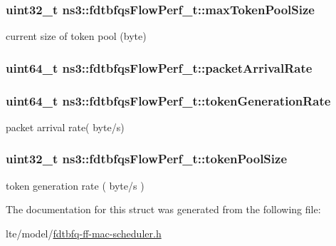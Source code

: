 \subsubsection[{\texorpdfstring{max\+Token\+Pool\+Size}{maxTokenPoolSize}}]{\setlength{\rightskip}{0pt plus 5cm}uint32\+\_\+t ns3\+::fdtbfqs\+Flow\+Perf\+\_\+t\+::max\+Token\+Pool\+Size}\hypertarget{structns3_1_1fdtbfqsFlowPerf__t_acf8230e7891aff039887ee3b4b31cc5a}{}\label{structns3_1_1fdtbfqsFlowPerf__t_acf8230e7891aff039887ee3b4b31cc5a}


current size of token pool (byte) 

\subsubsection[{\texorpdfstring{packet\+Arrival\+Rate}{packetArrivalRate}}]{\setlength{\rightskip}{0pt plus 5cm}uint64\+\_\+t ns3\+::fdtbfqs\+Flow\+Perf\+\_\+t\+::packet\+Arrival\+Rate}\hypertarget{structns3_1_1fdtbfqsFlowPerf__t_aa6fd077fde3105081d62e6c46741a1c5}{}\label{structns3_1_1fdtbfqsFlowPerf__t_aa6fd077fde3105081d62e6c46741a1c5}
\subsubsection[{\texorpdfstring{token\+Generation\+Rate}{tokenGenerationRate}}]{\setlength{\rightskip}{0pt plus 5cm}uint64\+\_\+t ns3\+::fdtbfqs\+Flow\+Perf\+\_\+t\+::token\+Generation\+Rate}\hypertarget{structns3_1_1fdtbfqsFlowPerf__t_ada77287bdf68b8d1919a896cd4892822}{}\label{structns3_1_1fdtbfqsFlowPerf__t_ada77287bdf68b8d1919a896cd4892822}


packet arrival rate( byte/s) 

\subsubsection[{\texorpdfstring{token\+Pool\+Size}{tokenPoolSize}}]{\setlength{\rightskip}{0pt plus 5cm}uint32\+\_\+t ns3\+::fdtbfqs\+Flow\+Perf\+\_\+t\+::token\+Pool\+Size}\hypertarget{structns3_1_1fdtbfqsFlowPerf__t_ac30c1a2a07383c9609ca96133b863a55}{}\label{structns3_1_1fdtbfqsFlowPerf__t_ac30c1a2a07383c9609ca96133b863a55}


token generation rate ( byte/s ) 



The documentation for this struct was generated from the following file\+:\begin{DoxyCompactItemize}
\item 
lte/model/\hyperlink{fdtbfq-ff-mac-scheduler_8h}{fdtbfq-\/ff-\/mac-\/scheduler.\+h}\end{DoxyCompactItemize}
